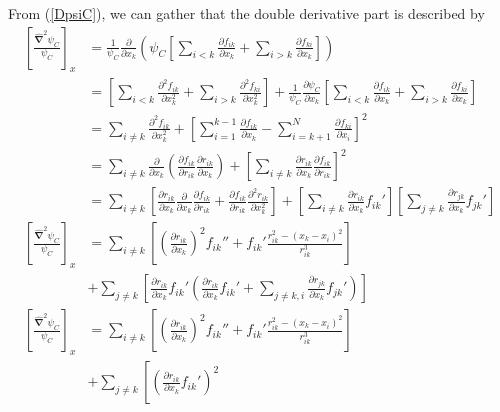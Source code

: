 \documentclass[twocolumn,12pt]{extarticle}
\newcommand{\eq}[1]{{\small\begin{align*}#1\end{align*}}}
\newcommand{\op}[1]{\hat{#1}}
\begin{document}
From (\ref{DpsiC}), we can gather that the double derivative part is described by
\eq{
  \left[\frac{\mathbf{\op\nabla}^2 \psi_C}{\psi_C}\right]_x
  &=\frac{1}{\psi_C}\frac{\partial}{\partial x_k}\left(\psi_C
      \left[\sum_{i<k} \frac{\partial f_{ik}}{\partial x_k}
      +\sum_{i>k} \frac{\partial f_{ki}}{\partial x_k} \right]\right)\\
  &=\left[\sum_{i<k} \frac{\partial^2 f_{ik}}{\partial x_k^2}
      +\sum_{i>k} \frac{\partial^2 f_{ki}}{\partial x_k^2} \right]
      +\frac{1}{\psi_C}\frac{\partial \psi_C}{\partial x_k}
      \left[\sum_{i<k} \frac{\partial f_{ik}}{\partial x_k}
      +\sum_{i>k} \frac{\partial f_{ki}}{\partial x_k} \right]\\
  &=\sum_{i\neq k}\frac{\partial^2 f_{ik}}{\partial x_k^2} +
    \left[\sum_{i=1}^{k-1}\frac{\partial f_{ik}}{\partial x_k} -
    \sum_{i=k+1}^{N}\frac{\partial f_{ki}}{\partial x_i}
    \right]^2\\
  &=\sum_{i\neq k}
    \frac{\partial}{\partial x_k}
    \left(
    \frac{\partial f_{ik}}{\partial r_{ik}}
    \frac{\partial r_{ik}}{\partial x_k}
    \right)+
    \left[\sum_{i\neq k}\frac{\partial r_{ik}}{\partial x_k}
    \frac{\partial f_{ik}}{\partial r_{ik}}
    \right]^2\\
  &=\sum_{i\neq k}
    \left[
    \frac{\partial r_{ik}}{\partial x_k}
    \frac{\partial}{\partial x_k}
    \frac{\partial f_{ik}}{\partial r_{ik}}
    +
    \frac{\partial f_{ik}}{\partial r_{ik}}
    \frac{\partial^2 r_{ik}}{\partial x_k^2}\right]
    +
    \left[\sum_{i\neq k}\frac{\partial r_{ik}}{\partial x_k} f_{ik}'
    \right]
    \left[\sum_{j\neq k}\frac{\partial r_{jk}}{\partial x_k} f_{jk}'
    \right]\\
  \left[\frac{\mathbf{\op\nabla}^2 \psi_C}{\psi_C}\right]_x
  &=\sum_{i\neq k}
    \left[
    \left(
    \frac{\partial r_{ik}}{\partial x_k}
    \right)^2
    f_{ik}''
    +
    f_{ik}'
    \frac{r_{ik}^2 - (x_k-x_i)^2}{r_{ik}^3}\right]
    \\&+
    \sum_{j\neq k}\left[\frac{\partial r_{ik}}{\partial x_k} f_{ik}'\left(
    \frac{\partial r_{ik}}{\partial x_k} f_{ik}'+
    \sum_{j\neq k,i} \frac{\partial r_{jk}}{\partial x_k} f_{jk}'\right)
    \right]\\
  \left[\frac{\mathbf{\op\nabla}^2 \psi_C}{\psi_C}\right]_x
  &=\sum_{i\neq k}
    \left[
    \left(
    \frac{\partial r_{ik}}{\partial x_k}
    \right)^2
    f_{ik}''
    +
    f_{ik}'
    \frac{r_{ik}^2 - (x_k-x_i)^2}{r_{ik}^3}\right]
    \\&+
    \sum_{j\neq k}\left[\left(\frac{\partial r_{ik}}{\partial x_k} f_{ik}'\right)^2
}
\end{document}
